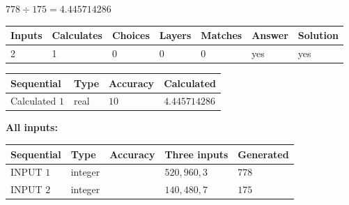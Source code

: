 \documentclass{ctexart}
\begin{document}
 

$ %
778 \div  %
175=   %
4.445714286$
 
 
\noindent{}
 
 

 
   
   
   
   
\noindent\begin{tabular}{|l|l|l|l|l|l|l|}
 \hline
Inputs & Calculates & Choices & Layers & Matches & Answer & Solution \\ \hline
 2  & 
 1  & 
 0
  & 
 0  & 
 0  & 
  yes & 
  yes 
  \\ \hline
 \end{tabular}
   
   
   
   
\noindent{}
   
   
  
  
\noindent\begin{tabular}{|l|l|l|l|}
\hline
 Sequential & Type & Accuracy & Calculated \\ 
\hline
 
 
  Calculated $  1 $ & real & $  10  $ & 
 $ 4.445714286 $ 
 \\  \hline  
 \end{tabular}
   
   
   
   
\noindent\vspace{0.1in}\hspace{-0.08in} {\textbf{\Large{All inputs: }}}
   
   
  
  
\noindent\begin{tabular}{|l|l|l|l|l|}
\hline
 Sequential & Type & Accuracy & Three inputs & Generated \\ 
\hline
 
 
  INPUT $  1 $ & integer &  & $
 520
 , 
 960
 , 
 3
 $ & $ 778 $ 
 \\  \hline  
 
 
  INPUT $  2 $ & integer &  & $
 140
 , 
 480
 , 
 7
 $ & $ 175 $ 
 \\  \hline  
 \end{tabular}
   
   
  
\vspace{0.2in}
  
\end{document}
